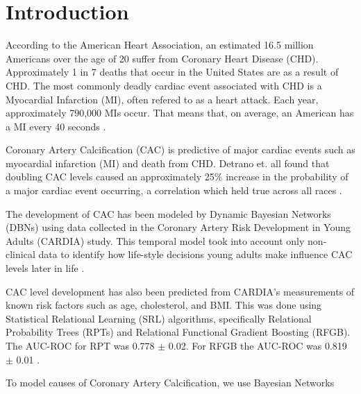 \section{Introduction}

According to the American Heart Association, an estimated 16.5 million Americans over the age of 20 suffer from Coronary Heart Disease (CHD). Approximately 1 in 7 deaths that occur in the United States are as a result of CHD. The most commonly deadly cardiac event associated with CHD is a Myocardial Infarction (MI), often refered to as a heart attack. Each year, approximately 790,000 MIs occur. That means that, on average, an American has a MI every 40 seconds \cite{Benjamin2017}.

Coronary Artery Calcification (CAC) is predictive of major cardiac events such as myocardial infarction (MI) and death from CHD. Detrano et. all found that doubling CAC levels caused an approximately 25\% increase in the probability of a major cardiac event occurring, a correlation which held true across all races \cite{Detrano2008}. 

The development of CAC has been modeled by Dynamic Bayesian Networks (DBNs) using data collected in the Coronary Artery Risk Development in Young Adults (CARDIA) study. This temporal model took into account only non-clinical data to identify how life-style decisions young adults make influence CAC levels later in life \cite{Yang}.

CAC level development has also been predicted from CARDIA's measurements of known risk factors such as age, cholesterol, and BMI. This was done using Statistical Relational Learning (SRL) algorithms, specifically Relational Probability Trees (RPTs) and Relational Functional Gradient Boosting (RFGB). The AUC-ROC for RPT was 0.778 $\pm$ 0.02. For RFGB the AUC-ROC was 0.819 $\pm$ 0.01 \cite{Natarajan2013}. 



To model causes of Coronary Artery Calcification, we use Bayesian Networks


